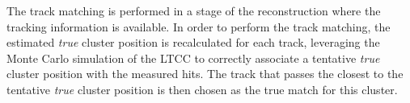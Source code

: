The track matching is performed in a stage of the reconstruction where the tracking information is available. In
order to perform the track matching, the estimated \textit{true} cluster position is recalculated for each track,
leveraging the Monte Carlo simulation of the LTCC to correctly associate a tentative \textit{true} cluster position
with the measured hits. The track that passes the closest to the tentative \textit{true} cluster position is then
chosen as the true match for this cluster.
